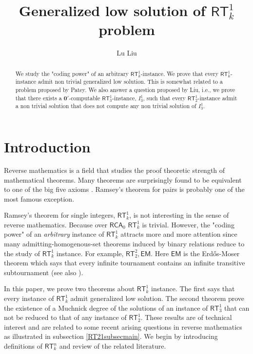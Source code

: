 \documentclass[options]{amsart}
\title{Generalized low solution
of $\mathsf{RT}_k^1$ problem }
\date{}
\author{Lu Liu }
\theoremstyle{definition}
\theoremstyle{remark}
\newtheorem{Ramsey's theorem}[theorem]{Ramsey's theorem}
\begin{document}
\begin{abstract}
We study the "coding power" of an arbitrary
$\mathsf{RT}_k^1$-instance. We prove that every
$\mathsf{RT}_k^1$-instance admit non trivial
generalized low
solution. This is somewhat related to a problem proposed
by Patey. We also answer a question proposed by
Liu, i.e., we prove that there exists a
$\mathbf{0}'$-computable
$\mathsf{RT}_3^1$-instance, $I_3^1$, such that every
$\mathsf{RT}_2^1$-instance admit a non trivial
solution that does not compute any non trivial solution
of $I_3^1$.
\end{abstract}
\maketitle

\section{Introduction}

Reverse mathematics is a field that studies
the proof theoretic strength of mathematical
theorems.
Many theorems are surprisingly found
to be equivalent to one of the big five
axioms \cite{simpson1999subsystems}. Ramsey's theorem
for pairs is probably
one of the most famous exception.

Ramsey's theorem for single
integers, $\mathsf{RT}_k^1$, is not
interesting in the sense of
reverse mathematics. Because over $\mathsf{RCA}_0$
$\mathsf{RT}_k^1$ is trivial.
However, the "coding power" of an \emph{arbitrary}
instance of $\mathsf{RT}_k^1$ attracts more
and more attention since many admitting-homogenous-set
theorems induced by binary relations reduce to
the study of  $\mathsf{RT}_k^1$
instance. For example, $\mathsf{RT}_2^2, \mathsf{EM}$.
Here $\mathsf{EM}$ is the Erd\H{o}s-Moser theorem which says
that every infinite tournament contains
an infinite transitive subtournament
(see also \cite{lerman2013separating}).

In this paper, we prove two theorems about
$\mathsf{RT}_k^1$ instance. The first says
that every instance of $\mathsf{RT}_k^1$
admit generalized low solution. The second
theorem prove the existence of a
Muchnick degree of the solutions
of an instance of
$\mathsf{RT}_3^1$ that can not be
reduced to that of
any instance of $\mathsf{RT}_2^1$.
These results are of technical interest
and are related to some recent arising
questions in reverse mathematics
as illustrated in subsection \ref{RT21subsecmain}.
We begin by introducing
definitions of $\mathsf{RT}_k^n$ and
review of the related literature.
\end{document}
